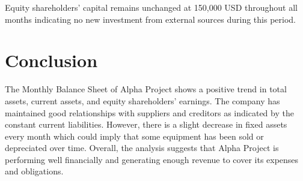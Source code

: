 Equity shareholders' capital remains unchanged at 150,000 USD throughout all months indicating no new investment from external sources during this period.

\section{Conclusion}
The Monthly Balance Sheet of Alpha Project shows a positive trend in total assets, current assets, and equity shareholders' earnings. The company has maintained good relationships with suppliers and creditors as indicated by the constant current liabilities. However, there is a slight decrease in fixed assets every month which could imply that some equipment has been sold or depreciated over time. Overall, the analysis suggests that Alpha Project is performing well financially and generating enough revenue to cover its expenses and obligations.